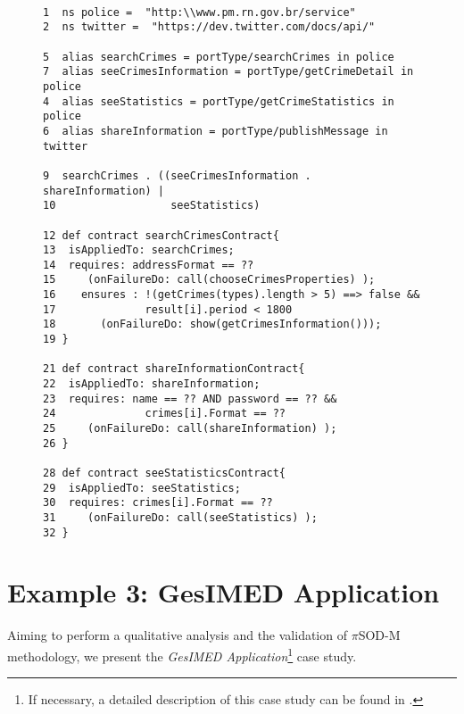 \begin{figure}[ht!]
\tiny
\centering
\begin{lstlisting}[label=list:crimeStatisticsPEWS,caption=pi-PEWS Specification: Crime
statistic and share information. ]

1  ns police =  "http:\\www.pm.rn.gov.br/service"
2  ns twitter =  "https://dev.twitter.com/docs/api/"

5  alias searchCrimes = portType/searchCrimes in police
7  alias seeCrimesInformation = portType/getCrimeDetail in police
4  alias seeStatistics = portType/getCrimeStatistics in police
6  alias shareInformation = portType/publishMessage in twitter

9  searchCrimes . ((seeCrimesInformation . shareInformation) |
10					seeStatistics)

12 def contract searchCrimesContract{
13  isAppliedTo: searchCrimes;    
14  requires: addressFormat == ?? 
15     (onFailureDo: call(chooseCrimesProperties) );  
16    ensures : !(getCrimes(types).length > 5) ==> false &&
17              result[i].period < 1800
18       (onFailureDo: show(getCrimesInformation())); 
19 }

21 def contract shareInformationContract{
22  isAppliedTo: shareInformation;    
23  requires: name == ?? AND password == ?? &&
24              crimes[i].Format == ?? 
25     (onFailureDo: call(shareInformation) );  
26 }

28 def contract seeStatisticsContract{
29  isAppliedTo: seeStatistics;    
30  requires: crimes[i].Format == ?? 
31     (onFailureDo: call(seeStatistics) );  
32 }
\end{lstlisting}
\label{fig:crimeStatisticsPEWS}  
\end{figure}  


  

\section{Example 3: GesIMED Application}
\label{sec:siw_gesimed}

Aiming to perform a qualitative analysis and the validation of $\pi$SOD-M
methodology, we present the \textit{GesIMED Application}\footnote{If necessary, a detailed description of this case
 study can be found in \cite{valeriaThesis}.}
 case study.  


